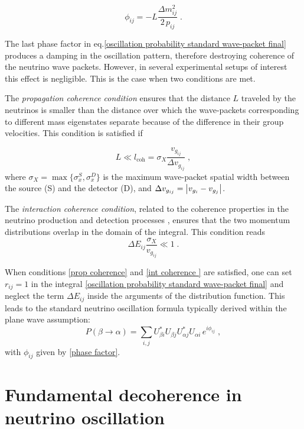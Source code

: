 \documentclass[11pt]{article}
\begin{document}
\begin{equation}\label{phase factor}
     \phi_{ij} = - L\frac{\Delta m^2_{ij}}{2\,p_{ij}}\;.
\end{equation}


The last phase factor in eq.\eqref{oscillation probability standard wave-packet final} produces a damping  in the oscillation pattern, therefore destroying coherence of the neutrino wave packets. However, in several experimental setups of interest this effect is negligible.  This is the case when two conditions are met. 

The \emph{propagation coherence condition}  ensures that the distance $L$ traveled by the neutrinos is smaller than the distance over which the wave-packets corresponding to different mass eigenstates separate because of the difference in their group velocities. This condition is satisfied if

\begin{equation}
    L \ll l_{\text{coh}} = \sigma_X\frac{v_{g_{ij}}}{\Delta v_{g_{ij}}}\;, \label{prop coherence}
\end{equation}
where $\sigma_X=\max \Big\{\sigma_{x}^S,\sigma_{x}^D\Big\}$ is the maximum wave-packet spatial width between the source (S) and the detector (D), and $\Delta v_{g_{ij}} = \abs{v_{g_i}-v_{g_j}}$.

The \emph{interaction coherence condition}, related to the coherence properties in the neutrino
production and detection processes \cite{Akhmedov:2009rb}, ensures that the two momentum distributions overlap in the domain of the integral. This condition reads
\begin{equation}\label{int coherence }
    \Delta E_{ij}\frac{\sigma_X}{v_{g_{ij}}} \ll 1\;.
\end{equation}


When  conditions \eqref{prop coherence} and \eqref{int coherence } are satisfied, one can set $r_{ij}=1$ in the integral \eqref{oscillation probability standard wave-packet final} and neglect the term $\Delta E_{ij}$ inside the arguments of the distribution function. This leads to the standard neutrino oscillation formula typically derived within the plane wave assumption:
\begin{equation}\label{eq:oscillation standard}
     P(\beta\to\alpha) = \sum_{i,j} U^*_{\beta i} U_{\beta j} U^*_{\alpha j} U_{\alpha i}\,e^{i\phi_{ij}}\;,
\end{equation}
with $\phi_{ij}$ given by \eqref{phase factor}.

\section{Fundamental decoherence in neutrino oscillation}
\label{decoherence sec}
\end{document}
